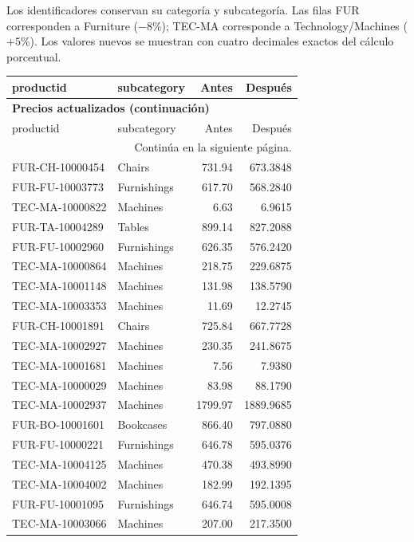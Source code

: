 Los identificadores conservan su categoría y subcategoría. Las filas FUR corresponden a Furniture ($-8\%$); TEC-MA corresponde a Technology/Machines ($+5\%$). Los valores nuevos se muestran con cuatro decimales exactos del cálculo porcentual.
\begingroup
\small
\setlength{\LTpre}{4pt}
\setlength{\LTpost}{4pt}
\renewcommand{\arraystretch}{1.13}
\begin{longtable}{llrr}
\toprule\rowcolor{Fondo} productid & subcategory & Antes & Después\\\midrule\endfirsthead
\multicolumn{4}{l}{\sffamily\bfseries Precios actualizados (continuación)}\\[5pt]
\toprule\rowcolor{Fondo} productid & subcategory & Antes & Después\\\midrule\endhead
\midrule\multicolumn{4}{r}{\small Continúa en la siguiente página.}\\\endfoot
\bottomrule\endlastfoot
FUR-CH-10000454 & Chairs & 731.94 & 673.3848\\
FUR-FU-10003773 & Furnishings & 617.70 & 568.2840\\
TEC-MA-10000822 & Machines & 6.63 & 6.9615\\
FUR-TA-10004289 & Tables & 899.14 & 827.2088\\
FUR-FU-10002960 & Furnishings & 626.35 & 576.2420\\
TEC-MA-10000864 & Machines & 218.75 & 229.6875\\
TEC-MA-10001148 & Machines & 131.98 & 138.5790\\
TEC-MA-10003353 & Machines & 11.69 & 12.2745\\
FUR-CH-10001891 & Chairs & 725.84 & 667.7728\\
TEC-MA-10002927 & Machines & 230.35 & 241.8675\\
TEC-MA-10001681 & Machines & 7.56 & 7.9380\\
TEC-MA-10000029 & Machines & 83.98 & 88.1790\\
TEC-MA-10002937 & Machines & 1799.97 & 1889.9685\\
FUR-BO-10001601 & Bookcases & 866.40 & 797.0880\\
FUR-FU-10000221 & Furnishings & 646.78 & 595.0376\\
TEC-MA-10004125 & Machines & 470.38 & 493.8990\\
TEC-MA-10004002 & Machines & 182.99 & 192.1395\\
FUR-FU-10001095 & Furnishings & 646.74 & 595.0008\\
TEC-MA-10003066 & Machines & 207.00 & 217.3500\\

\end{longtable}
